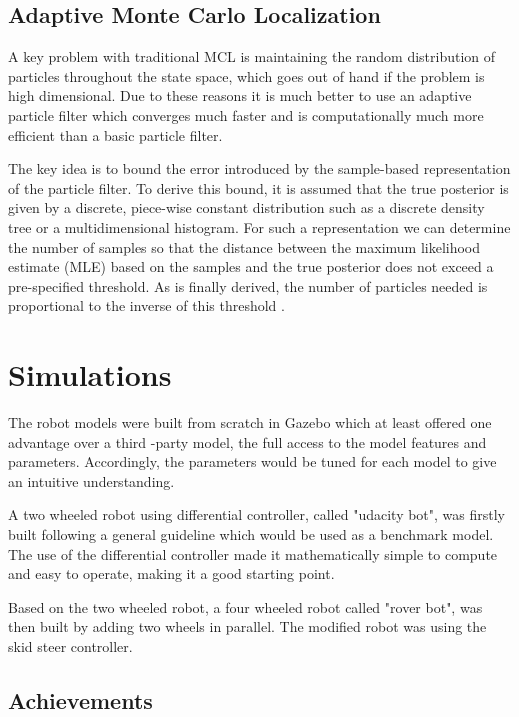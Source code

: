 \documentclass[10pt,journal,compsoc]{IEEEtran}
\begin{document}
\subsection{Adaptive Monte Carlo Localization}

A key problem with traditional MCL is maintaining the random distribution of particles throughout the state space, which goes out of hand if the problem is high dimensional. Due to these reasons it is much better to use an adaptive particle filter which converges much faster and is computationally much more efficient than a basic particle filter.

The key idea is to bound the error introduced by the sample-based representation of the particle filter. To derive this bound, it is assumed that the true posterior is given by a discrete, piece-wise constant distribution such as a discrete density tree or a multidimensional histogram. For such a representation we can determine the number of samples so that the distance between the maximum likelihood estimate (MLE) based on the samples and the true posterior does not exceed a pre-specified threshold. As is finally derived, the number of particles needed is proportional to the inverse of this threshold \cite{adaptive-pf}.

\section{Simulations}

The robot models were built from scratch in Gazebo which at least offered one advantage over a third -party model, the full access to the model features and parameters. Accordingly, the parameters would be tuned for each model to give an intuitive understanding.

A two wheeled robot using differential controller, called "udacity bot", was firstly built following a general guideline which would be used as a benchmark model. The use of the differential controller made it mathematically simple to compute and easy to operate, making it a good starting point.

Based on the two wheeled robot, a four wheeled robot called "rover bot", was then built by adding two wheels in parallel. The modified robot was using the skid steer controller.

\subsection{Achievements}
\end{document}
